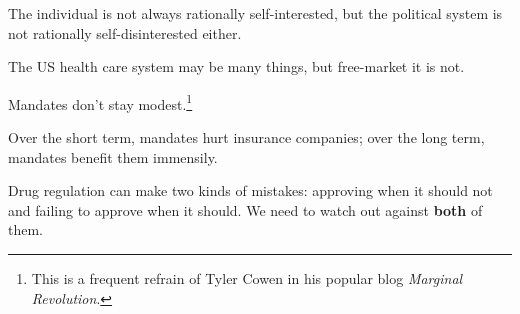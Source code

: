 \thought The individual is not always rationally self-interested, but the
political system is not rationally self-disinterested either.

\thought The US health care system may be many things, but free-market it is
not.

\thought Mandates don't stay modest.\footnote{This is a frequent refrain of
Tyler Cowen in his popular blog \emph{Marginal Revolution}.}

\thought Over the short term, mandates hurt insurance companies; over the long
term, mandates benefit them immensily.

\thought Drug regulation can make two kinds of mistakes: approving when it
should not and failing to approve when it should. We need to watch out against
\textbf{both} of them.


